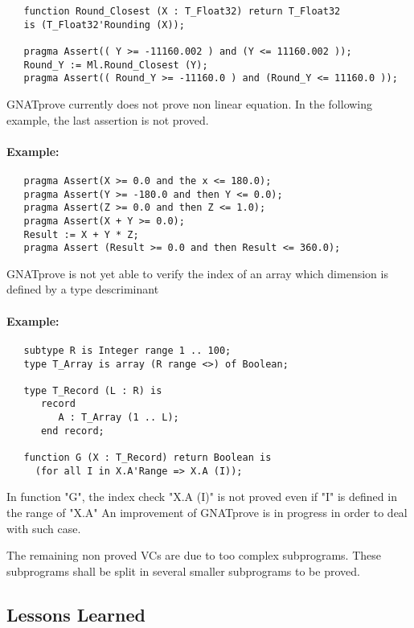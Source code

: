 \documentclass[10pt,a4paper,twocolumn]{article}
\newcommand{\gnatprove}{GNATprove\xspace}
\begin{document}
\begin{verbatim}
   function Round_Closest (X : T_Float32) return T_Float32
   is (T_Float32'Rounding (X));

   pragma Assert(( Y >= -11160.002 ) and (Y <= 11160.002 ));
   Round_Y := Ml.Round_Closest (Y);
   pragma Assert(( Round_Y >= -11160.0 ) and (Round_Y <= 11160.0 ));
\end{verbatim}

\gnatprove currently does not prove non linear equation.
In the following example, the last assertion is not proved.

\paragraph{Example:}

\begin{verbatim}
   pragma Assert(X >= 0.0 and the x <= 180.0);
   pragma Assert(Y >= -180.0 and then Y <= 0.0);
   pragma Assert(Z >= 0.0 and then Z <= 1.0);
   pragma Assert(X + Y >= 0.0);
   Result := X + Y * Z;
   pragma Assert (Result >= 0.0 and then Result <= 360.0);
\end{verbatim}

\gnatprove is not yet able to verify the index of an array which dimension is defined by a type descriminant

\paragraph{Example:}

\begin{verbatim}
   subtype R is Integer range 1 .. 100;
   type T_Array is array (R range <>) of Boolean;

   type T_Record (L : R) is
      record
         A : T_Array (1 .. L);
      end record;

   function G (X : T_Record) return Boolean is
     (for all I in X.A'Range => X.A (I));
\end{verbatim}

In function "G", the index check "X.A (I)" is not proved even if "I" is defined in the range of "X.A"
An improvement of \gnatprove is in progress in order to deal with such case.

The remaining non proved VCs are due to too complex subprograms.
These subprograms shall be split in several smaller subprograms to be proved.
\fi

\subsection{Lessons Learned}
\end{document}
